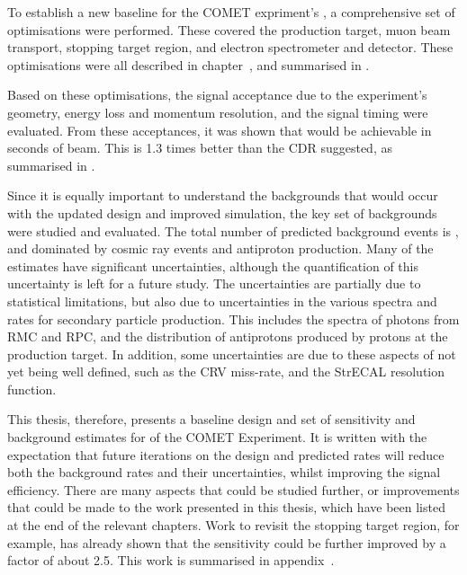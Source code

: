 To establish a new baseline for the COMET expriment's \phaseII, a comprehensive set of optimisations were performed.
These covered the production target, muon beam transport, stopping target region, and electron spectrometer and detector.
These optimisations were all described in chapter~, and summarised in .

Based on these optimisations, the signal acceptance due to the experiment's geometry, energy loss and momentum resolution, and the signal timing were evaluated.
From these acceptances, it was shown that \VarPredictedSES would be achievable in \VarRunTime seconds of beam.
This is 1.3 times better than the \phaseII CDR suggested, as summarised in .

Since it is equally important to understand the backgrounds that would occur with the updated design and improved simulation, 
the key set of backgrounds were studied and evaluated.
The total number of predicted background events is \VarTotalBgPhasII, and dominated by cosmic ray events and antiproton production.
Many of the estimates have significant uncertainties, although the quantification of this uncertainty is left for a future study.
The uncertainties are partially due to statistical limitations, but also due to uncertainties in the various spectra and rates for secondary particle production.
This includes the spectra of photons from \acl{RMC} and \acl{RPC}, and the distribution of antiprotons produced by protons at the production target.
In addition, some uncertainties are due to these aspects of \phaseII not yet being well defined, such as the \ac{CRV} miss-rate, and the StrECAL resolution function.

This thesis, therefore, presents a baseline design and set of sensitivity and background estimates for \phaseII of the COMET Experiment.
It is written with the expectation that future iterations on the design and predicted rates will reduce both the background rates and their uncertainties, whilst improving the signal efficiency.
There are many aspects that could be studied further, or improvements that could be made to the work presented in this thesis, which have been listed at the end of the relevant chapters.
Work to revisit the stopping target region, for example, has already shown that the sensitivity could be further improved by a factor of about 2.5.
This work is summarised in appendix~.


